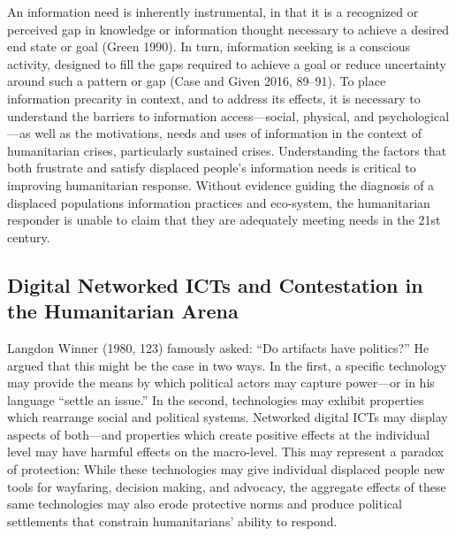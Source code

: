 An information need is inherently instrumental, in that it is a
recognized or perceived gap in knowledge or information thought
necessary to achieve a desired end state or goal (Green 1990). In turn,
information seeking is a conscious activity, designed to fill the gaps
required to achieve a goal or reduce uncertainty around such a pattern
or gap (Case and Given 2016, 89--91). To place information precarity in
context, and to address its effects, it is necessary to understand the
barriers to information access---social, physical, and
psychological---as well as the motivations, needs and uses of
information in the context of humanitarian crises, particularly
sustained crises. Understanding the factors that both frustrate and
satisfy displaced people's information needs is critical to improving
humanitarian response. Without evidence guiding the diagnosis of a
displaced populations information practices and eco-system, the
humanitarian responder is unable to claim that they are adequately
meeting needs in the 21st century.

\hypertarget{digital-networked-icts-and-contestation-in-the-humanitarian-arena}{%
\subsection{Digital Networked ICTs and Contestation in the Humanitarian
Arena}\label{digital-networked-icts-and-contestation-in-the-humanitarian-arena}}

Langdon Winner (1980, 123) famously asked: ``Do artifacts have
politics?'' He argued that this might be the case in two ways. In the
first, a specific technology may provide the means by which political
actors may capture power---or in his language ``settle an issue.'' In
the second, technologies may exhibit properties which rearrange social
and political systems. Networked digital ICTs may display aspects of
both---and properties which create positive effects at the individual
level may have harmful effects on the macro-level. This may represent a
paradox of protection: While these technologies may give individual
displaced people new tools for wayfaring, decision making, and advocacy,
the aggregate effects of these same technologies may also erode
protective norms and produce political settlements that constrain
humanitarians' ability to respond.


